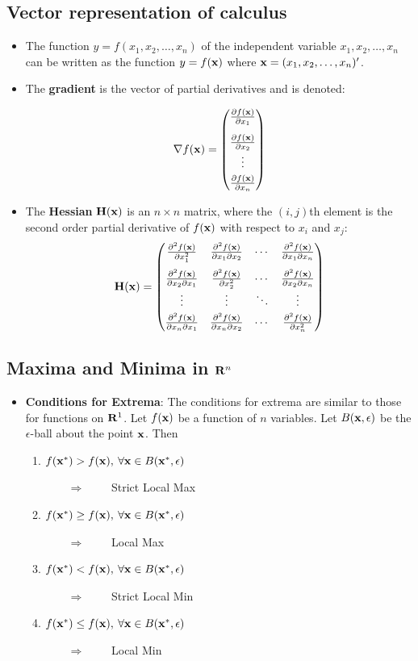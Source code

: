 \documentclass[11pt]{article}
\newcommand{\bi}{\begin{itemize}}
\newcommand{\ei}{\end{itemize}}
\newcommand{\be}{\begin{enumerate}}
\newcommand{\ee}{\end{enumerate}}
\newcommand{\ro}{{\bf R}^1 }
\newcommand{\rn}{{\bf R}^n }
\newcommand{\lra}{\Longrightarrow}
\newcommand{\pbt}{\parbox[t]{2in}}
\newcommand{\eps}{\epsilon}
\newcommand{\bpm}{\begin{pmatrix}}
\newcommand{\epm}{\end{pmatrix}}
\newcommand{\bfx}{{\bf x}}
\newcommand{\fx}{f(\bfx)}
\newcommand{\pr}{\partial}
\newcommand{\pf}{\pr \fx}
\newcommand{\grad}{\nabla \fx}
\newcommand{\hx}{\bf H(x)}
\begin{document}
\subsection{Vector representation of calculus}

\bi

\item The function $y = f(x_1, x_2, \ldots,x_n)$ of the independent variable
$x_1, x_2, \ldots, x_n$ can be written as the function $y=f({\bf
  x})$ where ${\bf x} = (x_1, x_2, \ldots, x_n)'$.  

\item The \textbf{gradient} is the vector of partial derivatives and is
  denoted:

$$\grad = \bpm
\frac{\pf}{\pr x_1}\\[9pt] \frac{\pf}{\pr x_2}\\
  \vdots \\[3pt] \frac{\pf}{\pr x_n} \epm$$



\item The  {\bf Hessian} $\hx$ is
an $n\times n$ matrix, where the $(i,j)$th element is the second order
partial derivative of $f(\bfx)$ with respect to $x_i$ and $x_j$:
$$\hx=\bpm
\frac{\pr^2 \fx}{\pr x_1^2}&\frac{\pr^2\fx}{\pr x_1 \pr x_2}&
\cdots & \frac{\pr^2 \fx}{\pr x_1 \pr x_n}\\[9pt]
\frac{\pr^2 \fx}{\pr x_2 \pr x_1}&\frac{\pr^2\fx}{\pr x_2^2}&
\cdots & \frac{\pr^2 \fx}{\pr x_2 \pr x_n}\\
\vdots & \vdots & \ddots & \vdots \\[3pt]
\frac{\pr^2 \fx}{\pr x_n \pr x_1}&\frac{\pr^2\fx}{\pr x_n \pr x_2}&
\cdots & \frac{\pr^2 \fx}{\pr x_n^2}\epm$$


\ei


\subsection{Maxima and Minima in $\rn$}

\bi

\item {\bf Conditions for Extrema}:  The conditions for extrema are
similar to those for functions on $\ro$.  Let $f(\bfx)$ be a function of
$n$ variables.  Let $B(\bfx, \eps)$ be the $\eps$-ball about the point
$\bfx$.  Then
  \be
  \item \pbt{$f(\bfx^*)>f(\bfx), \: \forall \bfx\in B(\bfx^*,\eps)$}
  $\qquad \lra \qquad$ Strict Local Max
  \item \pbt{$f(\bfx^*)\ge f(\bfx), \: \forall \bfx\in B(\bfx^*,\eps)$}
  $\qquad \lra \qquad$ Local Max
  \item \pbt{$f(\bfx^*)<f(\bfx), \: \forall \bfx\in B(\bfx^*,\eps)$}
  $\qquad \lra \qquad$ Strict Local Min
  \item \pbt{$f(\bfx^*)\le f(\bfx), \: \forall \bfx\in B(\bfx^*,\eps)$}
  $\qquad \lra \qquad$ Local Min
  \ee
\ei
\end{document}
